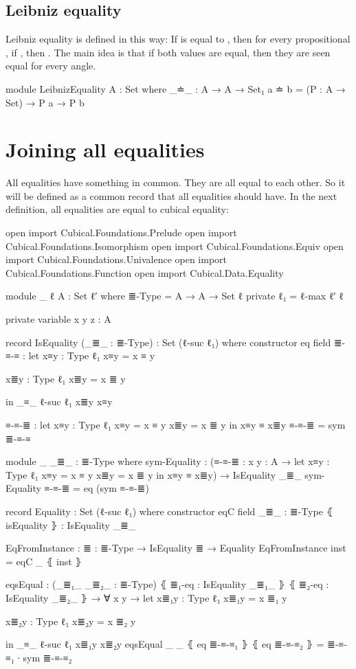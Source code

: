 \documentclass{article}
\begin{document}
\subsection{Leibniz equality}

Leibniz equality is defined in this way:
If  is equal to , then for every propositional , if ,
then .
The main idea is that if both values are equal, then they are seen equal for every angle.

\begin{code}
module LeibnizEquality {A : Set} where
  _≐_ : A → A → Set₁
  a ≐ b = (P : A → Set) → P a → P b
\end{code}

\section{Joining all equalities}

All equalities have something in common. They are all equal to each other.
So it will be defined as a common record that all equalities should have.
In the next definition, all equalities are equal to cubical equality:

\begin{code}

open import Cubical.Foundations.Prelude
open import Cubical.Foundations.Isomorphism
open import Cubical.Foundations.Equiv
open import Cubical.Foundations.Univalence
open import Cubical.Foundations.Function
open import Cubical.Data.Equality

module _ {ℓ} {A : Set ℓ′} where
  ≣-Type = A → A → Set ℓ
  private
    ℓ₁ = ℓ-max ℓ′ ℓ

  private variable
    x y z : A

  record IsEquality (_≣_ : ≣-Type) : Set (ℓ-suc ℓ₁) where
    constructor eq
    field
      ≣-≡-≡ : let
        x≡y : Type ℓ₁
        x≡y = x ≡ y

        x≣y : Type ℓ₁
        x≣y = x ≣ y

        in _≡_ {ℓ-suc ℓ₁} x≣y x≡y

    ≡-≡-≣ : let
      x≡y : Type ℓ₁
      x≡y = x ≡ y
      x≣y = x ≣ y
      in x≡y ≡ x≣y
    ≡-≡-≣ = sym ≣-≡-≡

  module _ {_≣_ : ≣-Type} where
    sym-Equality : (≡-≡-≣ : {x y : A} → let
      x≡y : Type ℓ₁
      x≡y = x ≡ y
      x≣y = x ≣ y
      in x≡y ≡ x≣y)
      → IsEquality _≣_
    sym-Equality ≡-≡-≣ = eq (sym ≡-≡-≣)

  record Equality : Set (ℓ-suc ℓ₁) where
    constructor eqC
    field
      _≣_ : ≣-Type
      ⦃ isEquality ⦄ : IsEquality _≣_

  EqFromInstance : {≣ : ≣-Type} → IsEquality ≣ → Equality
  EqFromInstance inst = eqC _ ⦃ inst ⦄

  eqsEqual : (_≣₁_ _≣₂_ : ≣-Type)
    ⦃ ≣₁-eq : IsEquality _≣₁_ ⦄
    ⦃ ≣₂-eq : IsEquality _≣₂_ ⦄
    → ∀ {x y} → let
      x≣₁y : Type ℓ₁
      x≣₁y = x ≣₁ y

      x≣₂y : Type ℓ₁
      x≣₂y = x ≣₂ y

      in _≡_ {ℓ-suc ℓ₁} x≣₁y x≣₂y
  eqsEqual _ _ ⦃ eq ≣-≡-≡₁ ⦄ ⦃ eq ≣-≡-≡₂ ⦄ = ≣-≡-≡₁ ∙ sym ≣-≡-≡₂
\end{code}
\end{document}
